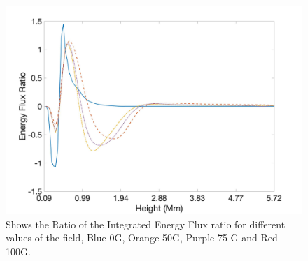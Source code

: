 \documentclass[linenumbers]{aastex63}
\begin{document}


\begin{figure}
    \label{energyfluxratio_50G_75G_100G_line}
    \centering
    \includegraphics[scale=0.08]{energyfluxratio.jpg}
    \caption{Shows the Ratio of the Integrated Energy Flux ratio for different values of the field, Blue 0G, Orange 50G, Purple 75 G and Red 100G.}
\end{figure}
\end{document}
